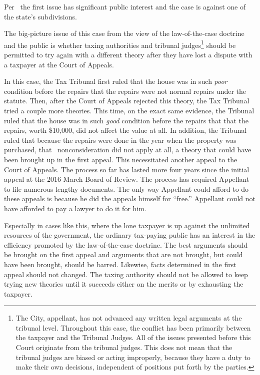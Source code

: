 \documentclass[12pt,\documentclassflag]{michiganCourtOfAppealsBrief}
\begin{document}
Per \cite{MCR 7.305(B)(2)}\ the first issue has significant public interest and the case is against one of the state's subdivisions.

The big-picture issue of this case from the view of the law-of-the-case doctrine and the public is whether taxing authorities and tribunal judges\footnote{The City, appellant, has not advanced any written legal arguments at the tribunal level. Throughout this case, the conflict has been primarily between the taxpayer and the Tribunal Judges. All of the issues presented before this Court originate from the tribunal judges. This does not mean that the tribunal judges are biased or acting improperly, because they have a duty to make their own decisions, independent of positions put forth by the parties.} should be permitted to try again with a different theory after they have lost a dispute with a taxpayer at the Court of Appeals.

In this case, the Tax Tribunal first ruled that the house was in such \emph{poor} condition before the repairs that the repairs were not normal repairs under the statute. Then, after the Court of Appeals rejected this theory, the Tax Tribunal tried a couple more theories. This time, on the exact same evidence, the Tribunal ruled that the house was in such \emph{good} condition before the repairs that that the repairs, worth \$10,000, did not affect the value at all. In addition, the Tribunal ruled that because the repairs were done in the year when the property was purchased, that \mathieuGast\ nonconsideration did not apply at all, a theory that could have been brought up in the first appeal. This necessitated another appeal to the Court of Appeals. The process so far has lasted more four years since the initial appeal at the 2016 March Board of Review. The process has required Appellant to file numerous lengthy documents. The only way Appellant could afford to do these appeals is because he did the appeals himself for ``free.'' Appellant could not have afforded to pay a lawyer to do it for him.

Especially in cases like this, where the lone taxpayer is up against the unlimited resources of the government, the ordinary tax-paying public has an interest in the efficiency promoted by the law-of-the-case doctrine. The best arguments should be brought on the first appeal and arguments that are not brought, but could have been brought, should be barred. Likewise, facts determined in the first appeal should not changed. The taxing authority should not be allowed to keep trying new theories until it succeeds either on the merits or by exhausting the taxpayer. 
\end{document}
